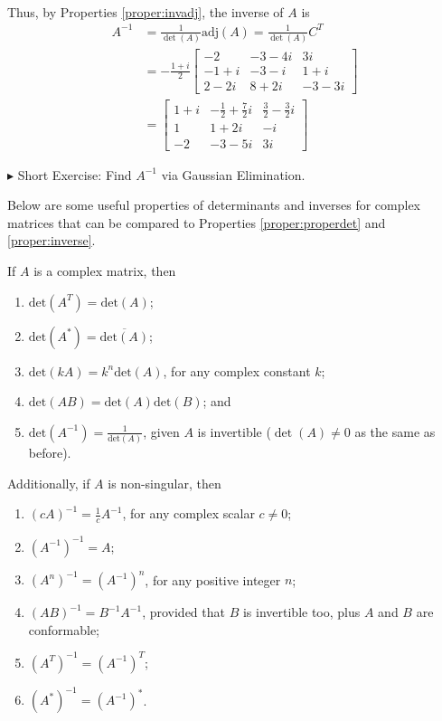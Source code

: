 \begin{solution}
\begin{align*}
\end{align*}
Thus, by Properties \ref{proper:invadj}, the inverse of $A$ is
\begin{align*}
A^{-1} &= \frac{1}{\det(A)} \text{adj}(A) = \frac{1}{\det(A)} C^T \\
&= -\frac{1+i}{2} 
\begin{bmatrix}
-2 & -3-4i & 3i \\
-1+i & -3-i & 1+i \\
2-2i & 8+2i & -3-3i
\end{bmatrix} \\
&= 
\begin{bmatrix}
1+i & -\frac{1}{2}+\frac{7}{2}i & \frac{3}{2}-\frac{3}{2}i \\
1 & 1+2i & -i \\
-2 & -3-5i & 3i
\end{bmatrix} 
\end{align*}
\end{solution}

$\blacktriangleright$ Short Exercise: Find $A^{-1}$ via Gaussian Elimination.\footnotemark

Below are some useful properties of determinants and inverses for complex matrices that can be compared to Properties \ref{proper:properdet} and \ref{proper:inverse}.
\begin{proper}
If $A$ is a complex matrix, then
\begin{enumerate}
\item $\text{det}(A^T) = \text{det}(A)$;
\item $\text{det}(A^*) = \overline{\text{det}(A)}$;
\item $\text{det}(kA) = k^n \text{det}(A)$, for any complex constant $k$;
\item $\text{det}(AB) = \text{det}(A)\text{det}(B)$; and
\item $\text{det}(A^{-1}) = \frac{1}{\text{det}(A)}$, given $A$ is invertible ($\det(A) \neq 0$ as the same as before).
\end{enumerate}
Additionally, if $A$ is non-singular, then
\begin{enumerate}
\item $(cA)^{-1} = \frac{1}{c}A^{-1}$, for any complex scalar $c \neq 0$;
\item $(A^{-1})^{-1} = A$;
\item $(A^n)^{-1} = (A^{-1})^n$, for any positive integer $n$;
\item $(AB)^{-1} = B^{-1}A^{-1}$, provided that $B$ is invertible too, plus $A$ and $B$ are conformable;
\item $(A^T)^{-1} = (A^{-1})^T$;
\item $(A^*)^{-1} = (A^{-1})^*$.
\end{enumerate}
\end{proper}

